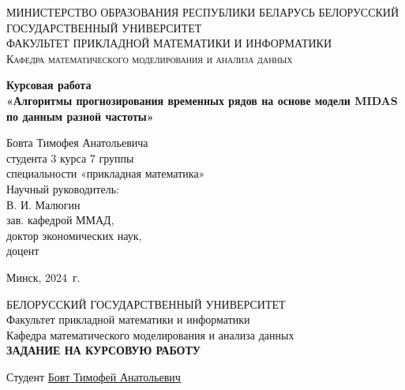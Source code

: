 \documentclass[a4paper, 12pt]{extarticle}
\numberwithin{equation}{subsection}
\begin{document}
	\def\contentsname{ОГЛАВЛЕНИЕ}
	
	\begin{titlepage}
		\begin{center}
			\textsc{МИНИСТЕРСТВО ОБРАЗОВАНИЯ РЕСПУБЛИКИ БЕЛАРУСЬ БЕЛОРУССКИЙ ГОСУДАРСТВЕННЫЙ УНИВЕРСИТЕТ
				\\[5mm]
				ФАКУЛЬТЕТ ПРИКЛАДНОЙ МАТЕМАТИКИ И ИНФОРМАТИКИ\\[2mm]
				Кафедра математического моделирования и анализа данных
			}
			
			\vfill
			
			\textbf{Курсовая работа
				\\[3mm]
				«Алгоритмы прогнозирования временных рядов на основе модели MIDAS по данным разной частоты»
				\\[26mm]
			}
		\end{center}
		
		\hfill
		\begin{minipage}{.5\textwidth}
			\begin{flushright}
				Бовта Тимофея Анатольевича\\
				студента 3 курса 7 группы\\
				специальности «прикладная математика»\\[5mm]
				
				Научный руководитель:\\[2mm] 
				В. И. Малюгин\\
				зав. кафедрой ММАД,\\
				доктор экономических наук,\\
				доцент
			\end{flushright}
		\end{minipage}%
		\vfill
		\begin{center}
			Минск, 2024\ г.
		\end{center}
	\end{titlepage}
	\newpage
	\setcounter{page}{2}
	\begin{center}
		\large{БЕЛОРУССКИЙ ГОСУДАРСТВЕННЫЙ УНИВЕРСИТЕТ}
		\\[2mm]
		Факультет прикладной математики и информатики\\[5mm]
		Кафедра математического моделирования и анализа данных\\[5mm]
		\large{\textbf{ЗАДАНИЕ НА КУРСОВУЮ РАБОТУ\\[20mm]}}
	\end{center}
	Студент \quad \underline{Бовт Тимофей Анатольевич\hspace*{\linegoal}}\\[2mm]
\end{document}
